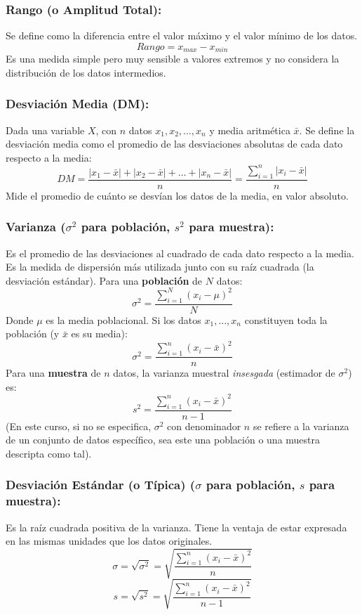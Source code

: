 \documentclass[12pt, letterpaper]{article}
\begin{document}
\subsubsection{Rango (o Amplitud Total):}
Se define como la diferencia entre el valor máximo y el valor mínimo de los datos.
\[ Rango = x_{max} - x_{min} \]
Es una medida simple pero muy sensible a valores extremos y no considera la distribución de los datos intermedios.

\subsubsection{Desviación Media (DM):}
Dada una variable $X$, con $n$ datos $x_1, x_2, \dots, x_n$ y media aritmética $\bar{x}$. Se define la desviación media como el promedio de las desviaciones absolutas de cada dato respecto a la media:
\[ DM = \frac{|x_1-\bar{x}|+|x_2-\bar{x}|+\dots+|x_n-\bar{x}|}{n} = \frac{\sum_{i=1}^{n} |x_i - \bar{x}|}{n} \]
Mide el promedio de cuánto se desvían los datos de la media, en valor absoluto.

\subsubsection{Varianza ($\sigma^2$ para población, $s^2$ para muestra):}
Es el promedio de las desviaciones al cuadrado de cada dato respecto a la media. Es la medida de dispersión más utilizada junto con su raíz cuadrada (la desviación estándar).
Para una \textbf{población} de $N$ datos:
\[ \sigma^2 = \frac{\sum_{i=1}^{N} (x_i - \mu)^2}{N} \]
Donde $\mu$ es la media poblacional. Si los datos $x_1, \dots, x_n$ constituyen toda la población (y $\bar{x}$ es su media):
\[ \sigma^2 = \frac{\sum_{i=1}^{n} (x_i - \bar{x})^2}{n} \]
Para una \textbf{muestra} de $n$ datos, la varianza muestral \textit{insesgada} (estimador de $\sigma^2$) es:
\[ s^2 = \frac{\sum_{i=1}^{n} (x_i - \bar{x})^2}{n-1} \]
(En este curso, si no se especifica, $\sigma^2$ con denominador $n$ se refiere a la varianza de un conjunto de datos específico, sea este una población o una muestra descripta como tal).

\subsubsection{Desviación Estándar (o Típica) ($\sigma$ para población, $s$ para muestra):}
Es la raíz cuadrada positiva de la varianza. Tiene la ventaja de estar expresada en las mismas unidades que los datos originales.
\[ \sigma = \sqrt{\sigma^2} = \sqrt{\frac{\sum_{i=1}^{n} (x_i - \bar{x})^2}{n}} \]
\[ s = \sqrt{s^2} = \sqrt{\frac{\sum_{i=1}^{n} (x_i - \bar{x})^2}{n-1}} \]
\end{document}

